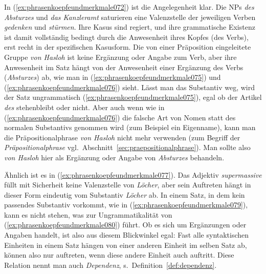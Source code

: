 \begin{exe}
  \ex\label{ex:phrasenkoepfeundmerkmale072}
  \begin{xlist}
  \end{xlist}
  \ex\label{ex:phrasenkoepfeundmerkmale077}
  \begin{xlist}
  \end{xlist}
\end{exe}


In (\ref{ex:phrasenkoepfeundmerkmale072}) ist die Angelegenheit klar.
Die NPs \textit{des Absturzes} und \textit{das Kanzleramt} saturieren eine Valenzstelle der jeweiligen Verben \textit{gedenken} und \textit{stürmen}.
Ihre Kasus sind regiert, und ihre grammatische Existenz ist damit vollständig bedingt durch die Anwesenheit ihres Kopfes (des Verbs), erst recht in der spezifischen Kasusform.
Die von einer Präposition eingeleitete Gruppe \textit{von Hasloh} ist keine Ergänzung oder Angabe zum Verb, aber ihre Anwesenheit im Satz hängt von der Anwesenheit einer Ergänzung des Verbs (\textit{Absturzes}) ab, wie man in (\ref{ex:phrasenkoepfeundmerkmale075}) und (\ref{ex:phrasenkoepfeundmerkmale076}) sieht.
Lässt man das Substantiv weg, wird der Satz ungrammatisch (\ref{ex:phrasenkoepfeundmerkmale075}), egal ob der Artikel \textit{des} stehenbleibt oder nicht.
Aber auch wenn wie in (\ref{ex:phrasenkoepfeundmerkmale076}) die falsche Art von Nomen statt des normalen Substantivs genommen wird (zum Beispiel ein Eigenname), kann man die Präpositionalphrase \textit{von Hasloh} nicht mehr verwenden (zum Begriff der \textit{Präpositionalphrase} vgl.\ Abschnitt~\ref{sec:praepositionalphrase}).
Man sollte also \textit{von Hasloh} hier als Ergänzung oder Angabe von \textit{Absturzes} behandeln.

Ähnlich ist es in (\ref{ex:phrasenkoepfeundmerkmale077}).
Das Adjektiv \textit{supermassive} füllt mit Sicherheit keine Valenzstelle von \textit{Löcher}, aber sein Auftreten hängt in dieser Form eindeutig vom Substantiv \textit{Löcher} ab.
In einem Satz, in dem kein passendes Substantiv vorkommt, wie in (\ref{ex:phrasenkoepfeundmerkmale079}), kann es nicht stehen, was zur Ungrammatikalität von (\ref{ex:phrasenkoepfeundmerkmale080}) führt.
Ob es sich um Ergänzungen oder Angaben handelt, ist also aus diesem Blickwinkel egal:
Fast alle syntaktischen Einheiten in einem Satz hängen von einer anderen Einheit im selben Satz ab, können also nur auftreten, wenn diese andere Einheit auch auftritt.
Diese Relation nennt man auch \textit{Dependenz}, s.\ Definition~\ref{def:dependenz}.

